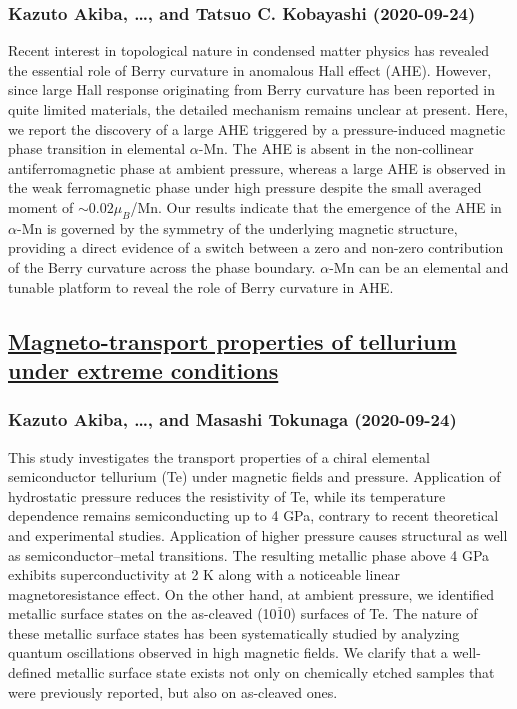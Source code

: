 \subsubsection*{Kazuto Akiba, \dots, and Tatsuo C. Kobayashi (2020-09-24)}
Recent interest in topological nature in condensed matter physics has
revealed the essential role of Berry curvature in anomalous Hall effect (AHE).
However, since large Hall response originating from Berry curvature has been
reported in quite limited materials, the detailed mechanism remains unclear at
present. Here, we report the discovery of a large AHE triggered by a
pressure-induced magnetic phase transition in elemental $\alpha$-Mn. The AHE is
absent in the non-collinear antiferromagnetic phase at ambient pressure,
whereas a large AHE is observed in the weak ferromagnetic phase under high
pressure despite the small averaged moment of $\sim 0.02 \mu_B$/Mn. Our results
indicate that the emergence of the AHE in $\alpha$-Mn is governed by the
symmetry of the underlying magnetic structure, providing a direct evidence of a
switch between a zero and non-zero contribution of the Berry curvature across
the phase boundary. $\alpha$-Mn can be an elemental and tunable platform to
reveal the role of Berry curvature in AHE.

\subsection*{\href{http://arxiv.org/abs/2009.11511v1}{Magneto-transport properties of tellurium under extreme conditions}}
\subsubsection*{Kazuto Akiba, \dots, and Masashi Tokunaga (2020-09-24)}
This study investigates the transport properties of a chiral elemental
semiconductor tellurium (Te) under magnetic fields and pressure. Application of
hydrostatic pressure reduces the resistivity of Te, while its temperature
dependence remains semiconducting up to 4 GPa, contrary to recent theoretical
and experimental studies. Application of higher pressure causes structural as
well as semiconductor--metal transitions. The resulting metallic phase above 4
GPa exhibits superconductivity at 2 K along with a noticeable linear
magnetoresistance effect. On the other hand, at ambient pressure, we identified
metallic surface states on the as-cleaved (10$\bar{1}$0) surfaces of Te. The
nature of these metallic surface states has been systematically studied by
analyzing quantum oscillations observed in high magnetic fields. We clarify
that a well-defined metallic surface state exists not only on chemically etched
samples that were previously reported, but also on as-cleaved ones.


